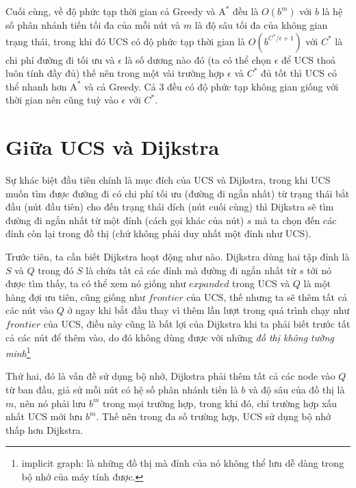 Cuối cùng, về độ phức tạp thời gian cả Greedy và $\text{A}^*$ đều là $O(b^m)$ với $b$ là hệ số phân nhánh tiến tối đa của mỗi nút và $m$ là độ sâu tối đa của không gian trạng thái, trong khi đó UCS có độ phức tạp thời gian là $O(b^{C^*/\epsilon + 1})$ với $C^*$ là chi phí đường đi tối ưu và $\epsilon$ là số dương nào đó (ta có thể chọn $\epsilon$ để UCS thoả luôn tính đầy đủ) thế nên trong một vài trường hợp $\epsilon$ và $C^*$ đủ tốt thì UCS có thể nhanh hơn $\text{A}^*$ và cả Greedy. Cả 3 đều có độ phức tạp không gian giống với thời gian nên cũng tuỳ vào $\epsilon$ với $C^*$.

\section{Giữa UCS và Dijkstra}
Sự khác biệt đầu tiên chính là mục đích của UCS và Dijkstra, trong khi UCS muốn tìm được đường đi có chi phí tối ưu (đường đi ngắn nhất) từ trạng thái bắt đầu (nút đầu tiên) cho đến trạng thái đích (nút cuối cùng) thì Dijkstra sẽ tìm đường đi ngắn nhất từ một đỉnh (cách gọi khác của nút) $s$ mà ta chọn đến các đỉnh còn lại trong đồ thị (chứ không phải duy nhất một đỉnh như UCS).
\vspace{7pt}

Trước tiên, ta cần biết Dijkstra hoạt động như nào. Dijkstra dùng hai tập đỉnh là $S$ và $Q$ trong đó $S$ là chứa tất cả các đỉnh mà đường đi ngắn nhất từ $s$ tới nó được tìm thấy, ta có thể xem nó giống như $expanded$ trong UCS và $Q$ là một hàng đợi ưu tiên, cũng giống như $frontier$ của UCS, thế nhưng ta sẽ thêm tất cả các nút vào $Q$ ở ngay khi bắt đầu thay vì thêm lần lượt trong quá trình chạy như $frontier$ của UCS, điều này cũng là bất lợi của Dijkstra khi ta phải biết trước tất cả các nút để thêm vào, do đó không dùng được với những \textit{đồ thị không tường minh}\footnote{implicit graph: là những đồ thị mà đỉnh của nó không thể lưu dễ dàng trong bộ nhớ của máy tính được.}
\vspace{7pt}

Thứ hai, đó là vấn đề sử dụng bộ nhớ, Dijkstra phải thêm tất cả các node vào $Q$ từ ban đầu, giả sử mỗi nút có hệ số phân nhánh tiến là $b$ và độ sâu của đồ thị là $m$, nên nó phải lưu $b^m$ trong mọi trường hợp, trong khi đó, chỉ trường hợp xấu nhất UCS mới lưu $b^m$. Thế nên trong đa số trường hợp, UCS sử dụng bộ nhớ thấp hơn Dijkstra.
\vspace{7pt}

